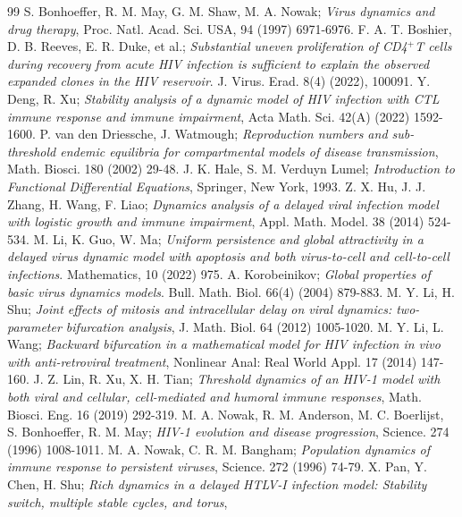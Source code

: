 \documentclass[10pt,a4paper]{amsart}
\numberwithin{equation}{section}
\begin{document}
\begin{thebibliography}{99}
  S. Bonhoeffer, R. M. May, G. M. Shaw, M. A. Nowak;
\emph{Virus dynamics and drug therapy}, Proc. Natl. Acad. Sci. USA, 94 (1997) 6971-6976.
   F. A. T. Boshier, D. B. Reeves, E. R. Duke,  et al.;
\emph{Substantial uneven proliferation of CD4$^+$T cells during recovery from acute 
HIV infection is sufficient to explain the observed expanded clones in the HIV reservoir}.
J. Virus. Erad. 8(4) (2022), 100091.
  Y. Deng, R. Xu;
\emph{Stability analysis of a dynamic model of HIV infection with CTL immune response 
and immune impairment},
Acta Math. Sci. 42(A) (2022) 1592-1600.
  P. van den Driessche, J. Watmough;
\emph{Reproduction numbers and sub-threshold endemic equilibria for compartmental 
models of disease transmission}, Math. Biosci. 180 (2002) 29-48.
  J. K. Hale, S. M. Verduyn Lumel;
\emph{Introduction to Functional Differential Equations}, Springer, New York, 1993.
  Z. X. Hu, J. J. Zhang, H. Wang, F. Liao;
\emph{Dynamics analysis of a delayed viral infection model with logistic growth 
and immune impairment}, Appl. Math. Model. 38 (2014) 524-534.
  M. Li, K. Guo, W. Ma;
\emph{Uniform persistence and global attractivity in a delayed virus dynamic
model with apoptosis and both virus-to-cell and cell-to-cell infections}. 
 Mathematics,  10 (2022) 975.
  A. Korobeinikov;
\emph{Global properties of basic virus dynamics models}. 
Bull. Math. Biol. 66(4) (2004)  879-883.
  M. Y. Li, H. Shu;
\emph{Joint effects of mitosis and intracellular delay on viral dynamics:
two-parameter bifurcation analysis}, J. Math. Biol. 64 (2012) 1005-1020.
  M. Y. Li, L. Wang;
\emph{Backward bifurcation in a mathematical model for HIV infection in 
vivo with anti-retroviral treatment}, Nonlinear Anal: Real World Appl.
17 (2014) 147-160.
  J. Z. Lin, R. Xu, X. H. Tian;
\emph{Threshold dynamics of an HIV-1 model with both viral and cellular, 
cell-mediated and humoral immune responses}, 
Math. Biosci. Eng. 16 (2019) 292-319.
  M. A. Nowak, R. M. Anderson, M. C. Boerlijst, S. Bonhoeffer, R. M. May;
\emph{HIV-1 evolution and disease progression}, Science. 274 (1996) 1008-1011.
  M. A. Nowak, C. R. M. Bangham;
\emph{Population dynamics of immune response to persistent viruses}, 
Science. 272 (1996) 74-79.
  X. Pan, Y. Chen, H. Shu;
\emph{Rich dynamics in a delayed HTLV-I infection model:
Stability switch, multiple stable cycles, and torus}, 

\end{thebibliography}
\end{document}
